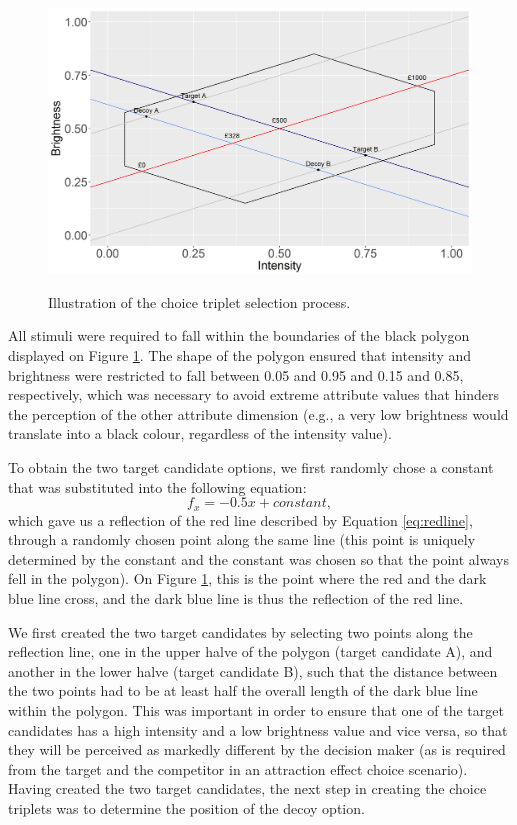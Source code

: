 \documentclass[11pt,a4paper]{article}
\begin{document}
\begin{figure}
\centering
\caption{Illustration of the choice triplet selection process.}
\includegraphics[width=1\textwidth]{Figure_1poly.png}
\label{fig:explain}
\end{figure}


All stimuli were required to fall within the boundaries of the black polygon displayed on Figure \ref{fig:explain}. The shape of the polygon ensured that intensity and brightness were restricted to fall between 0.05 and 0.95 and 0.15 and 0.85, respectively, which was necessary to avoid extreme attribute values that hinders the perception of the other attribute dimension (e.g., a very low brightness would translate into a black colour, regardless of the intensity value). 

 To obtain the two target candidate options, we first randomly chose a constant that was substituted into the following equation:
\begin{equation} \label{eq:blueline}
 f_{x} = -0.5x + constant,
\end{equation}
which gave us a reflection of the red line described by Equation \ref{eq:redline}, through a randomly chosen point along the same line (this point is uniquely determined by the constant and the constant was chosen so that the point always fell in the polygon). On Figure \ref{fig:explain}, this is the point where the red and the dark blue line cross, and the dark blue line is thus the reflection of the red line.

 We first created the two target candidates by selecting two points along the reflection line, one in the upper halve of the polygon (target candidate A), and another in the lower halve (target candidate B), such that the distance between the two points had to be at least half the overall length of the dark blue line within the polygon. This was important in order to ensure that one of the target candidates has a high intensity and a low brightness value and vice versa, so that they will be perceived as markedly different by the decision maker (as is required from the target and the competitor in an attraction effect choice scenario). Having created the two target candidates, the next step in creating the choice triplets was to determine the position of the decoy option. 
\end{document}

